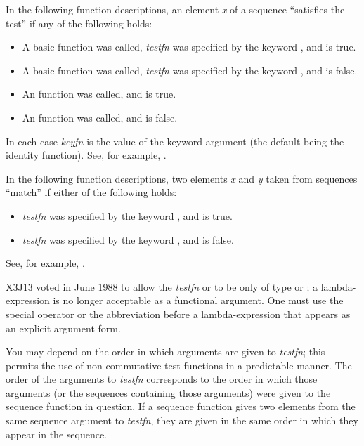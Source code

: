 In the following function descriptions, an element \emph{x} of a sequence
``satisfies the test'' if any of the following holds:
\begin{itemize}
\item
A basic function was called,
\emph{testfn} was specified by the keyword , and
 is true.

\item
A basic function was called,
\emph{testfn} was specified by the keyword , and
 is false.

\item
An  function was called, and
 is true.

\item
An  function was called, and
 is false.
\end{itemize}
In each case \emph{keyfn} is the
value of the  keyword argument (the default being the identity
function).  See, for example, .

In the following function descriptions,
two elements \emph{x} and \emph{y} taken from sequences ``match'' if
either of the following holds:
\begin{itemize}
\item
\emph{testfn} was specified by the keyword , and
 is true.

\item
\emph{testfn} was specified by the keyword , and
 is false.
\end{itemize}
See, for example, .

\begin{newer}
X3J13 voted in June 1988  to allow the \emph{testfn}
or 
to be only of type  or ; a lambda-expression
is no longer acceptable as a functional argument.  One must use the
 special operator or the abbreviation  before
a lambda-expression that appears as an  explicit argument form.
\end{newer}

You may depend on the order in which arguments
are given to \emph{testfn}; this permits the use of non-commutative
test functions in a predictable manner.
The order of the arguments to \emph{testfn} corresponds
to the order in which those arguments (or the sequences containing
those arguments)
were given to the sequence function in question.
If a sequence function gives two elements from the same
sequence argument to \emph{testfn}, they are given in the same order in
which they appear in the sequence.

